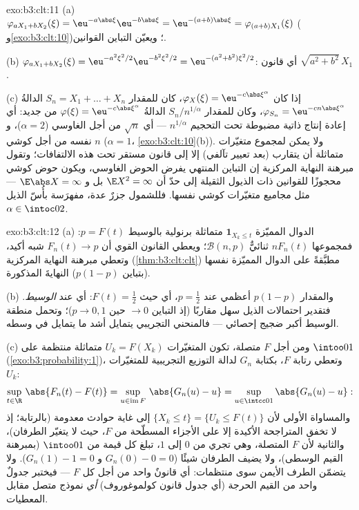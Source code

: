 \begin{solution}{exo:b3:clt:11}
(a) $\varphi_{aX_1 + bX_2}(\xi) =
\eu^{-a\abs\xi}\eu^{-b\abs\xi} = \eu^{-(a+b)\abs\xi} =
\varphi_{(a+b)X_1}(\xi)$ ( و\cref{exo:b3:clt:10})؛ ويعيّن التباين
القوانين.

(b) $\varphi_{aX_1+bX_2}(\xi) = \eu^{-a^2\xi^2/2}
\eu^{-b^2\xi^2/2} = \eu^{-(a^2+b^2)\xi^2/2}$: أي قانون $\sqrt{a^2+b^2}\,X_1$.

(c) إذا كان $\varphi_X(\xi) = \eu^{-c\abs\xi^\alpha}$، كان للمقدار $S_n = X_1 + \dots + X_n$ الدالةُ $\varphi_{S_n} =
\eu^{-cn\abs\xi^\alpha}$، وكان
للمقدار $S_n/n^{1/\alpha}$ الدالةُ $\varphi(\xi) = \eu^{-c\abs\xi^\alpha}$ من جديد: أي إعادة إنتاج ذاتية
مضبوطة تحت التحجيم $n^{1/\alpha}$ --- أي $\sqrt n$ من أجل
الغاوسي ($\alpha = 2$)، و $n$ نفسه من أجل كوشي ($\alpha = 1$،
\cref{exo:b3:clt:10}(b)). ولا يمكن لمجموع متغيّرات  متماثلة أن
يتقارب (بعد تعيير تآلفي) إلا إلى قانون مستقر تحت هذه
الالتفافات؛ وتقول مبرهنة النهاية المركزية إن التباين المنتهي
يفرض الحوض الغاوسي، ويكون حوض كوشي محجوزًا للقوانين ذات الذيول
الثقيلة إلى حدّ أن $\E X^2 = \infty$ بل و $\E\abs
X = \infty$ --- مثل مجاميع متغيّرات
كوشي نفسها. فللشمول جزرٌ عدة، مفهرَسة بأُسّ الذيل $\alpha \in \intoc02$.
\end{solution}

\begin{solution}{exo:b3:clt:12}
(a) الدوال المميّزة $\mathbf 1_{X_k \leq t}$  متماثلة برنولية بالوسيط
$p = F(t)$: فمجموعها $nF_n(t)$ ثنائيٌّ $\mathcal B(n, p)$؛ ويعطي القانون
القوي أن $F_n(t)
\to p$ شبه أكيد، وتعطي مبرهنة النهاية المركزية
(\cref{thm:b3:clt:clt}) مطبَّقةً على الدوال المميّزة نفسها (بتباين
$p(1-p)$) النهايةَ  المذكورة.

(b) والمقدار $p(1 - p)$ أعظمي عند $p = \frac12$، أي حيث
$F(t) = \frac12$: أي عند \emph{الوسيط}. فتقدير احتمالات الذيل
سهل مقاربًا (إذ التباين $\to 0$ حين $p \to 0, 1$)؛ وتحمل
منطقة الوسيط أكبر ضجيج إحصائي --- فالمنحني التجريبي يتمايل أشد
ما يتمايل في وسطه.

(c) ومن أجل $F$ متصلة، تكون المتغيّرات $U_k = F(X_k)$ 
متماثلة منتظمة على $\intoo01$ (\cref{exo:b3:probability:1})، وتعطي رتابة $F$،
بكتابة $G_n$ لدالة التوزيع التجريبية للمتغيّرات $U_k$:
\[
\sup_{t\in\R}\,\abs{F_n(t) - F(t)}
= \sup_{u \in \operatorname{im}F}\,\abs{G_n(u) - u}
= \sup_{u\in\intcc01}\abs{G_n(u) - u} :
\]
والمساواة الأولى لأن $\{X_k \leq t\} = \{U_k \leq
F(t)\}$ إلى غاية حوادث معدومة (بالرتابة؛
إذ لا تخفق المتراجحة الأكيدة إلا على الأجزاء المسطّحة من $F$،
حيث لا يتغيّر الطرفان)، والثانية لأن $F$ المتصلة، وهي تجري من
$0$ إلى $1$، تبلغ كل قيمة من $\intoo01$ (بمبرهنة القيم
الوسطى)، ولا يضيف الطرفان شيئًا ($G_n(0) - 0 = 0$ و
$G_n(1) - 1 = 0$). ولا يتضمّن الطرف الأيمن سوى منتظمات: أي
قانونٌ واحد من أجل كل $F$ --- فيختبر جدولٌ واحد من القيم الحرجة
(أي جدول قانون كولموغوروف) \emph{أي} نموذج متصل مقابل
المعطيات.
\end{solution}

